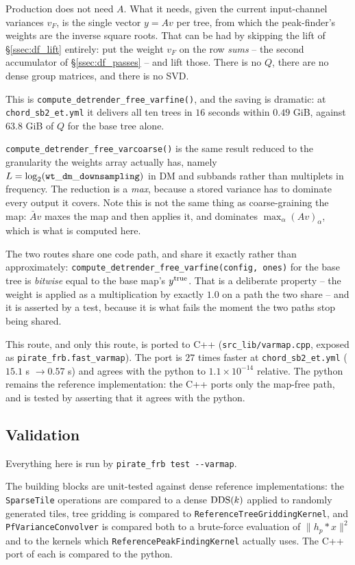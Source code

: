 \documentclass{article}
\numberwithin{equation}{section}   %
\def\DDS{{\rm DDS}}
\begin{document}
Production does not need $A$. What it needs, given the current input-channel variances $v_F$, is
the single vector $y = Av$ per tree, from which the peak-finder's weights are the inverse square
roots. That can be had by skipping the lift of \S\ref{ssec:df_lift} entirely: put the weight
$v_F$ on the row {\em sums} -- the second accumulator of \S\ref{ssec:df_passes} -- and lift
those. There is no $Q$, there are no dense group matrices, and there is no SVD.

This is \verb|compute_detrender_free_varfine()|, and the saving is dramatic: at
{\tt chord\_sb2\_et.yml} it delivers all ten trees in $16$ seconds within $0.49$ GiB, against
$63.8$ GiB of $Q$ for the base tree alone.

\verb|compute_detrender_free_varcoarse()| is the same result reduced to the granularity the
weights array actually has, namely $L = \log_2({\tt wt\_dm\_downsampling})$ in DM and subbands
rather than multiplets in frequency. The reduction is a {\em max}, because a stored variance has
to dominate every output it covers. Note this is not the same thing as coarse-graining the map:
$\bar A v$ maxes the map and then applies it, and dominates $\max_\alpha (Av)_\alpha$, which is
what is computed here.

The two routes share one code path, and share it exactly rather than approximately:
\verb|compute_detrender_free_varfine(config, ones)| for the base tree is {\em bitwise} equal to
the base map's $y^{\rm true}$. That is a deliberate property -- the weight is applied as a
multiplication by exactly $1.0$ on a path the two share -- and it is asserted by a test, because
it is what fails the moment the two paths stop being shared.

This route, and only this route, is ported to C++ (\verb|src_lib/varmap.cpp|, exposed as
\verb|pirate_frb.fast_varmap|). The port is $27$ times faster at {\tt chord\_sb2\_et.yml}
($15.1$ s $\rightarrow 0.57$ s) and agrees with the python to $1.1 \times 10^{-14}$ relative.
The python remains the reference implementation: the C++ ports only the map-free path, and is
tested by asserting that it agrees with the python.

\subsection{Validation}
\label{sec:avar_validation}

Everything here is run by \verb|pirate_frb test --varmap|.

The building blocks are unit-tested against dense reference implementations: the
\verb|SparseTile| operations are compared to a dense $\DDS(k)$ applied to randomly generated
tiles, tree gridding is compared to \verb|ReferenceTreeGriddingKernel|, and
\verb|PfVarianceConvolver| is compared both to a brute-force evaluation of $\|h_p * x\|^2$ and to
the kernels which \verb|ReferencePeakFindingKernel| actually uses. The C++ port of each is
compared to the python.
\end{document}
